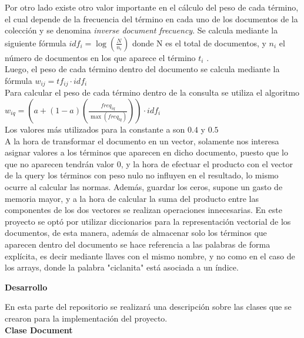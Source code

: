 \documentclass[12pt]{article}
\begin{document}
   Por otro lado existe otro valor importante en el c\'alculo del peso de cada t\'ermino, el cual depende de la frecuencia del t\'ermino en cada uno de los documentos de la colecci\'on y se denomina \textit{inverse document frecuency}. Se calcula mediante la siguiente f\'ormula $idf_{i}= \log(\frac{ N}{n_{i}})$ donde N es el total de documentos, y $n_{i}$ el n\'umero de documentos en los que aparece el t\'ermino $t_{i}$ .\\
   
   Luego, el peso de cada t\'ermino dentro del documento se calcula mediante la f\'ormula $w_{ij}= tf_{ij} \cdot idf_{i}$   \\
   
   Para calcular el peso de cada t\'ermino dentro de la consulta se utiliza el algoritmo $w_{iq}= ( a+ (1-a)(\frac{freq_{iq}}{ \max( freq_{lq})}) ) \cdot idf_{i}$  \\
   	
   	Los valores m\'as utilizados para la constante a son $0.4$ y $0.5$\\
   	
   	
   	A la hora de transformar el documento en un vector, solamente nos interesa asignar valores a los t\'erminos que aparecen en dicho documento, puesto que lo que no aparecen tendr\'an valor 0, y la hora de efectuar el producto con el vector de la query los t\'erminos con peso nulo no influyen en el resultado, lo mismo ocurre al calcular las normas. Adem\'as, guardar los ceros, supone un gasto de memoria mayor, y a la hora de calcular la suma del producto entre las componentes de los dos vectores se realizan operaciones innecesarias. En este proyecto se opt\'o por utilizar diccionarios para la representaci\'on vectorial de los documentos, de esta manera, adem\'as de almacenar solo los t\'erminos que aparecen dentro del documento se hace referencia a las palabras de forma expl\'icita, es decir mediante llaves con el mismo nombre, y no como en el caso de los arrays, donde la palabra "ciclanita" est\'a asociada a un \'indice.  \\
   	
  \newpage 
\begin{center}
	\textbf{Desarrollo}
\end{center}

En esta parte del repositorio se realizar\'a una descripci\'on sobre las clases que se crearon para la implementaci\'on del proyecto.  \\
 	
 \textbf{ Clase Document}
\end{document}
